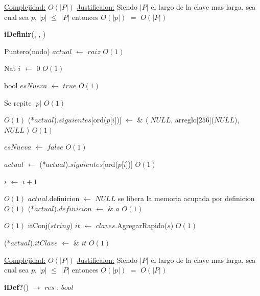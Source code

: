 \begin{Algoritmos}
\begin{algorithm}[H]
\begin{algorithmic}[1]
\medskip
\State \underline{Complejidad:} $O(|P|)$
\State \underline{Justificaion:} Siendo $|P|$ el largo de la clave mas larga, sea cual sea $p$, $|p|$ $\leq$ $|P|$ entonces 	$O(|p|)$ $=$ $O(|P|)$

\end{algorithmic}
\end{algorithm}
  

\begin{algorithm}[H]
{\textbf{iDefinir}(, , )}
\begin{algorithmic}[1]

\State Puntero(nodo) $actual$ $\gets$ $raiz$ \Comment $O(1)$

\State Nat $i$ $\gets$ $0$ \Comment $O(1)$

\State bool $esNueva$ $\gets$ $true$ \Comment $O(1)$

   \Comment Se repite $|p|$ $O(1)$
	
	
	 \Comment $O(1)$
		\State (*$actual$).$siguientes$[ord($p$[$i$])] $\gets$	 $\&$ $\langle$ $NULL$, arreglo[$256$]($NULL$), $NULL$ $\rangle$  \Comment $O(1)$
		
		\State $esNueva$ $\gets$ $false$ \Comment $O(1)$	 
	
	\EndIf
	
	\State $actual$ $\gets$ (*$actual$).$siguientes$[ord($p$[$i$])] \Comment $O(1)$

	\State $i$ $\gets$ $i + 1$
\EndWhile 

 \Comment $O(1)$
	\State $actual$.definicion $\gets$ $NULL$ \Comment se libera la memoria acupada por definicion $O(1)$
\EndIf
\State (*$actual$).$definicion$ $\gets$ $\&$ $a$ \Comment $O(1)$

 \Comment $O(1)$
	\State itConj($string$) $it$ $\gets$  $claves$.AgregarRapido($s$) \Comment $O(1)$
	
	\State (*$actual$).$itClave$ $\gets$ $\&$ $it$ \Comment $O(1)$
\EndIf

\medskip
\State \underline{Complejidad:} $O(|P|)$
\State \underline{Justificaion:} Siendo $|P|$ el largo de la clave mas larga, sea cual sea $p$, $|p|$ $\leq$ $|P|$ entonces 	$O(|p|)$ $=$ $O(|P|)$


\end{algorithmic}
\end{algorithm}  
  
  
\begin{algorithm}[H]
{\textbf{iDef?}() $\to$ $res$ : $bool$}
\begin{algorithmic}[1]


\end{algorithmic}
\end{algorithm}
\end{Algoritmos}
